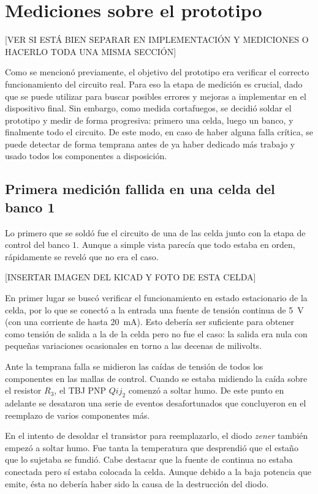 \section{Mediciones sobre el prototipo}

[VER SI ESTÁ BIEN SEPARAR EN IMPLEMENTACIÓN Y MEDICIONES O HACERLO TODA UNA MISMA SECCIÓN]

Como se mencionó previamente, el objetivo del prototipo era verificar el correcto funcionamiento del circuito real. Para eso la etapa de medición es crucial, dado que se puede utilizar para buscar posibles errores y mejoras a implementar en el dispositivo final. Sin embargo, como medida cortafuegos, se decidió soldar el prototipo y medir de forma progresiva: primero una celda, luego un banco, y finalmente todo el circuito. De este modo, en caso de haber alguna falla crítica, se puede detectar de forma temprana antes de ya haber dedicado más trabajo y usado todos los componentes a disposición.

\subsection{Primera medición fallida en una celda del banco 1}

Lo primero que se soldó fue el circuito de una de las celda junto con la etapa de control del banco $1$. Aunque a simple vista parecía que todo estaba en orden, rápidamente se reveló que no era el caso.

[INSERTAR IMAGEN DEL KICAD Y FOTO DE ESTA CELDA]

En primer lugar se buscó verificar el funcionamiento en estado estacionario de la celda, por lo que se conectó a la entrada una fuente de tensión continua de \SI{5}{\volt} (con una corriente de hasta \SI{20}{\milli\ampere}). Esto debería ser suficiente para obtener como tensión de salida a la de la celda pero no fue el caso: la salida era nula con pequeñas variaciones ocasionales en torno a las decenas de milivolts.

Ante la temprana falla se midieron las caídas de tensión de todos los componentes en las mallas de control. Cuando se estaba midiendo la caída sobre el resistor $R_3$, el TBJ PNP $Qij_2$ comenzó a soltar humo. De este punto en adelante se desataron una serie de eventos desafortunados que concluyeron en el reemplazo de varios componentes más.

En el intento de desoldar el transistor para reemplazarlo, el diodo \textit{zener} también empezó a soltar humo. Fue tanta la temperatura que desprendió que el estaño que lo sujetaba se fundió. Cabe destacar que la fuente de continua no estaba conectada pero sí estaba colocada la celda. Aunque debido a la baja potencia que emite, ésta no debería haber sido la causa de la destrucción del diodo.

